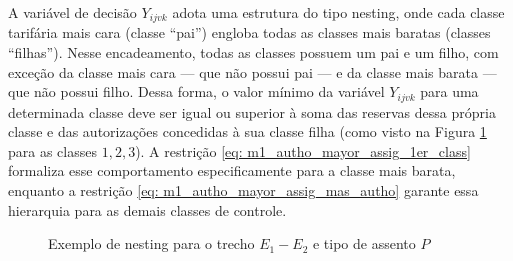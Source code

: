 A variável de decisão $Y_{ijvk}$ adota uma estrutura do tipo nesting, onde cada classe tarifária mais cara (classe “pai”) engloba todas as classes mais baratas (classes “filhas”). Nesse encadeamento, todas as classes possuem um pai e um filho, com exceção da classe mais cara — que não possui pai — e da classe mais barata — que não possui filho. Dessa forma, o valor mínimo da variável $Y_{ijvk}$ para uma determinada classe deve ser igual ou superior à soma das reservas dessa própria classe e das autorizações concedidas à sua classe filha (como visto na Figura \ref{fig: nesting} para as classes $1, 2, 3$). A restrição \eqref{eq: m1_autho_mayor_assig_1er_class} formaliza esse comportamento especificamente para a classe mais barata, enquanto a restrição \eqref{eq: m1_autho_mayor_assig_mas_autho} garante essa hierarquia para as demais classes de controle.
\begin{figure}[H]
	\begin{center}
	\end{center}
	\caption{Exemplo de nesting para o trecho $E_1 - E_2$ e tipo de assento $P$}
	\label{fig: nesting}
\end{figure}

